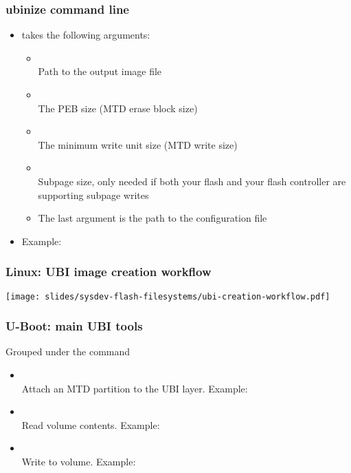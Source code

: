 \begin{frame}
  \frametitle{ubinize command line}
  \begin{itemize}
  \item {} takes the following arguments:
    \begin{itemize}
    \item {}\\
	Path to the output image file
    \item {}\\
	The PEB size (MTD erase block size)
    \item {}\\
	The minimum write unit size (MTD write size)
    \item {}\\
	Subpage size, only needed if both your flash and your
	flash controller are supporting subpage writes
    \item The last argument is the path to the 
	  configuration file
    \end{itemize}
  \item Example: 
  \end{itemize}
\end{frame}

\begin{frame}
  \frametitle{Linux: UBI image creation workflow}
  \begin{center}
    \texttt{[image: slides/sysdev-flash-filesystems/ubi-creation-workflow.pdf]}
  \end{center}
\end{frame}

\begin{frame}
  \frametitle{U-Boot: main UBI tools}
  Grouped under the  command
    \begin{itemize}
    \item {}\\
	Attach an MTD partition to the UBI layer. Example:\\
    \item {}\\
	Read volume contents. Example:\\
    \item {}\\
        Write to volume. Example:\\
	\\
    \end{itemize}
\end{frame}

